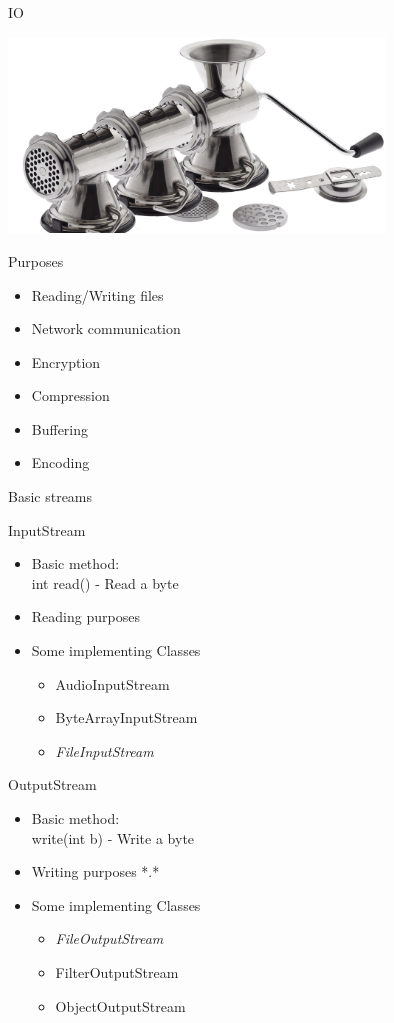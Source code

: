 \begin{frame}{IO}
	\begin{center}
		\includegraphics[width=10cm]{res/cookiepress2.jpg}
	\end{center}
\end{frame}

\begin{frame}{Purposes}
	\begin{itemize}
		\item Reading/Writing files
		\item Network communication
		\item Encryption
		\item Compression
		\item Buffering
		\item Encoding
	\end{itemize}
\end{frame}

\begin{frame}{Basic streams}
	\begin{multicols}{2}
	InputStream\\
	\begin{itemize}
		\item Basic method: \\ int read() - Read a byte
		\item Reading purposes
		\item Some implementing Classes
		\begin{itemize}
			\item AudioInputStream
			\item ByteArrayInputStream
			\item \emph{FileInputStream}
		\end{itemize}
	\end{itemize}
	\columnbreak
	OutputStream\\
	\begin{itemize}
		\item Basic method: \\ write(int b) - Write a byte
		\item Writing purposes *.*
		\item Some implementing Classes
		\begin{itemize}
			\item \emph{FileOutputStream}
			\item FilterOutputStream
			\item ObjectOutputStream
		\end{itemize}
	\end{itemize}
	\end{multicols}
\end{frame}

